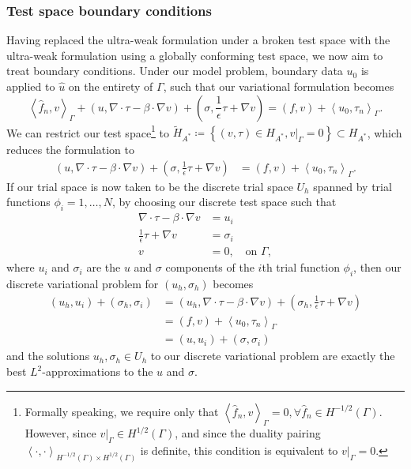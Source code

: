 \documentclass[11pt,onecolumn]{scrartcl}
\newcommand{\LRp}[1]{\left( #1 \right)}
\newcommand{\LRa}[1]{\left\langle #1 \right\rangle}
\newcommand{\LRc}[1]{\left\{ #1 \right\}}
\newcommand{\Grad} {\ensuremath{\nabla}}
\newcommand{\uh}{\widehat{u}}
\newcommand{\fnh}{\widehat{f}_n}
\newcommand{\grad}{\nabla}
\renewcommand{\div}{\grad \cdot}
\begin{document}
\subsubsection{Test space boundary conditions}
\label{L2OptTestBC}
Having replaced the ultra-weak formulation under a broken test space with the ultra-weak formulation using a globally conforming test space, we now aim to treat boundary conditions.  Under our model problem, boundary data $u_0$ is applied to $\uh$ on the entirety of $\Gamma$, such that our variational formulation becomes
\[
\LRa{\fnh,v}_{\Gamma} + \LRp{u, \Grad\cdot \tau - \beta\cdot \Grad v} + \LRp{\sigma, \frac{1}{\epsilon}\tau + \Grad v} = \LRp{f,v} + \LRa{u_0,\tau_n}_{\Gamma}.
\]
We can restrict our test space\footnote{Formally speaking, we require only that $\LRa{\fnh,v}_\Gamma = 0, \forall \fnh\in H^{-1/2}(\Gamma)$.  However, since $\left.v\right|_\Gamma \in H^{1/2}(\Gamma)$, and since the duality pairing $\LRa{\cdot,\cdot}_{H^{-1/2}(\Gamma)\times H^{1/2}(\Gamma)}$ is definite, this condition is equivalent to $\left.v\right|_\Gamma = 0$.} to $\tilde{H}_{A^*} \coloneqq \LRc{\LRp{v,\tau} \in H_{A^*}, \left.v\right|_\Gamma = 0} \subset H_{A^*}$, which reduces the formulation to
\begin{align*}
\LRp{u, \Grad\cdot \tau - \beta\cdot \Grad v} + \LRp{\sigma, \frac{1}{\epsilon}\tau + \Grad v} &= \LRp{f,v} + \LRa{u_0,\tau_n}_{\Gamma}.
\end{align*}
If our trial space is now taken to be the discrete trial space ${U}_h$ spanned by trial functions $\phi_i = 1,\ldots,N$, by choosing our discrete test space such that 
\begin{align*}
\div \tau - \beta\cdot \Grad v &= u_i\\
\frac{1}{\epsilon}\tau + \Grad v &= \sigma_i\\
v &= 0, \quad \text{on } \Gamma,
\end{align*}
where $u_i$ and $\sigma_i$ are the $u$ and $\sigma$ components of the $i$th trial function $\phi_i$, then our discrete variational problem for $\LRp{u_h,\sigma_h}$ becomes
\begin{align*}
\LRp{u_h,u_i} + \LRp{\sigma_h,\sigma_i}  &= \LRp{u_h, \Grad\cdot \tau - \beta\cdot \Grad v} + \LRp{\sigma_h, \frac{1}{\epsilon}\tau + \Grad v}  \\
&= \LRp{f,v} + \LRa{u_0,\tau_n}_{\Gamma} \\
&= \LRp{u,u_i} + \LRp{\sigma,\sigma_i}
\end{align*}
and the solutions $u_h,\sigma_h \in {U}_h$ to our discrete variational problem are exactly the best $L^2$-approximations to the $u$ and $\sigma$.
\end{document}
